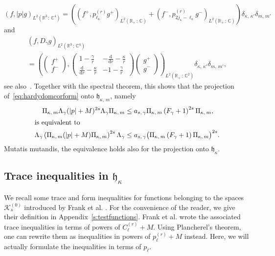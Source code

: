 \documentclass[10pt]{amsart}
\theoremstyle{definition}
\newcommand*\rd{\mathrm{d}}
\newcommand*\dr{\mathrm{d}r}
\newcommand*\cz{\mathbb{C}}
\newcommand*\rz{\mathbb{R}}
\newcommand*\cK{\mathcal{K}}
\newcommand*\gh{\mathfrak{h}}
\begin{document}
\[
\left(f,|p| g\right)_{L^2\left(\rz^3\,:\,\cz^4\right)} = \left(\left(f^+,p_{\ell_\kappa}^{(r)} g^+\right)_{L^2\left(\rz_+\,:\,\cz\right)} + \left(f^-,p_{2j_\kappa-\ell_\kappa}^{(r)} g^-\right)_{L^2\left(\rz_+\,:\,\cz\right)}\right)\delta_{\kappa,\,\kappa'}\delta_{m,\,m'}
\]
and
\begin{multline}\label{eq:radialdirac}
(f,D_\gamma g)_{L^2\left(\rz^3\,:\,\cz^4\right)}\\
= \left(\left(
\begin{matrix}
f^+\\ f^-
\end{matrix}
\right),\left(
\begin{matrix}
1-\frac{\gamma}{r} & -\frac{\rd}{\dr}-\frac{\kappa}{r}\\
\frac{\rd}{\dr}-\frac{\kappa}{r} & -1-\frac{\gamma}{r}
\end{matrix}
\right)\left(
\begin{matrix}
g^+\\ g^-
\end{matrix}
\right)\right)_{L^2\left(\rz_+\,:\,\cz^2\right)}\delta_{\kappa,\,\kappa'}\delta_{m,\,m'},
\end{multline}
see also~\cite[Formula~(7.105)]{Thaller1992}. Together with the spectral theorem, this shows that the projection of~\eqref{eq:hardydomcorform} onto $\gh_{\kappa,\,m}$, namely
\begin{align}
\Pi_{\kappa,\,m}\Lambda_\gamma(|p|+M)^{2s}\Lambda_\gamma\Pi_{\kappa,\,m}
&\leq a_{s,\,\gamma} \Pi_{\kappa,\,m}\left(F_\gamma+1\right)^{2s}\Pi_{\kappa,\,m},\label{eq:hardydomcorang0}\\
\intertext{is equivalent to}
\Lambda_\gamma\left(\Pi_{\kappa,\,m}(|p|+M)\Pi_{\kappa,\,m}\right)^{2s}\Lambda_\gamma
&\leq a_{s,\,\gamma}\big(\Pi_{\kappa,\,m}\left(F_{\gamma}+1\right)\Pi_{\kappa,\,m}\big)^{2s}.
\label{eq:hardydomcorang}
\end{align}
Mutatis mutandis, the equivalence holds also for the projection onto $\gh_\kappa$.

\subsection{Trace inequalities in \texorpdfstring{$\gh_\kappa$}{gh kappa}}\label{ss:traceinequalities}

We recall some trace and form inequalities for functions belonging to the spaces $\cK_{s}^{(0)}$ introduced by Frank et al. \cite{Franketal2020P}. For the convenience of the reader, we give their definition in Appendix~\ref{s:testfunctions}. Frank et al. \cite{Franketal2020P} wrote the associated trace inequalities in terms of powers of $C_\ell^{(r)}+M$. Using Plancherel's theorem, one can rewrite them as inequalities in powers of $p_\ell^{(r)}+M$ instead. Here, we will actually formulate the inequalities in terms of $p_\ell$.
\end{document}
